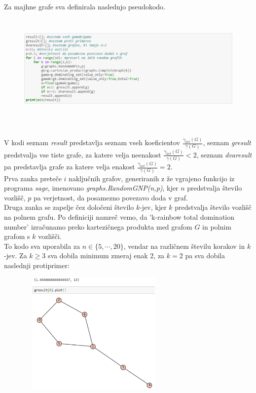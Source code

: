 \documentclass[a4paper]{article}
\begin{document}
Za majhne grafe sva definirala naslednjo pseudokodo.
\begin{figure}[h!]
    \centering
    \includegraphics[width=13cm, height=5.35cm]{Slika1}
    \label{fig:mesh1}
\end{figure}\\
V kodi seznam \textit{result} predstavlja seznam vseh koeficientov $\frac{\gamma_{krt}(G)}{\gamma(G)}$, seznam \textit{gresult} predstvalja vse tiste grafe, za katere velja neenakost $\frac{\gamma_{krt}(G)}{\gamma(G)} < 2$, seznam \textit{dvaresult} pa predstavlja grafe za katere velja enakost $\frac{\gamma_{krt}(G)}{\gamma(G)} = 2$.\\
Prva zanka preteče $i$ naključnih grafov, generiranih z že vgrajeno funkcijo iz programa \textit{sage}, imenovano \textit{graphs.RandomGNP(n,p)}, kjer $n$ predstvalja število vozlišč, $p$ pa verjetnost, da posamezno povezavo doda v graf.\\
Druga zanka se zapelje čez določeni število $k$-jev, kjer $k$ predstvalja število vozlišč na polnem grafu. Po definiciji namreč  vemo, da 'k-rainbow total domination number' izračunamo preko kartezičnega produkta med grafom $G$ in polnim grafom s $k$ vozlišči.\\[1.5mm]
To kodo sva uporabila za $n \in \{5, \cdots, 20\}$, vendar na različnem številu korakov in $k$-jev. Za $k \geq 3$ sva dobila minimum zmeraj enak 2, za $k = 2$ pa sva dobila naslednji protiprimer:
\begin{figure}[h!]
    \centering
    \includegraphics[width=7.5cm, height=6cm]{Slika2}
    \label{fig:mesh1}
\end{figure}\\
\end{document}
